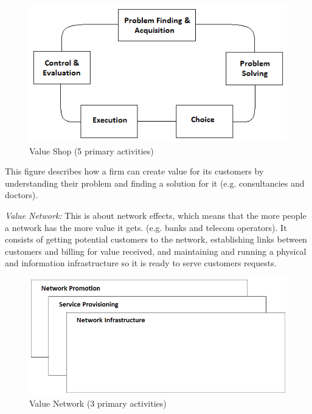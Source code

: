 \begin{figure}[h]
\caption[ValueShop]{Value Shop (5 primary activities) \cite{osterwalderthesis}}
\label{fig:ValueShop}
\begin{center}
\includegraphics[scale=0.8]{valueshop}
\end{center}
\end{figure}

This figure describes how a firm can create value for its customers by understanding their problem and finding a solution for it (e.g. consultancies and doctors).

\emph{Value Network:}
This is about network effects, which means that the more people a network has the more value it gets. (e.g. banks and telecom operators). It consists of getting potential customers to the network, establishing links between customers and billing for value received, and maintaining and running a physical and information infrastructure so it is ready to serve customers requests. 

\begin{figure}[h]
\caption[ValueNetwork]{Value Network (3 primary activities) \cite{osterwalderthesis}}
\label{fig:ValueNetwork}
\begin{center}
\includegraphics[scale=0.5]{valuenetwork}
\end{center}
\end{figure}

